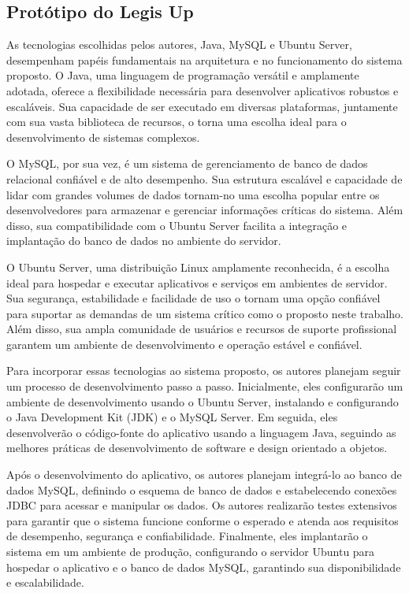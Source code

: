 \documentclass[12pt]{article}
\begin{document}
\subsection{Protótipo do Legis Up}

As tecnologias escolhidas pelos autores, Java, MySQL e Ubuntu Server, desempenham papéis fundamentais na arquitetura e no funcionamento do sistema proposto. O Java, uma linguagem de programação versátil e amplamente adotada, oferece a flexibilidade necessária para desenvolver aplicativos robustos e escaláveis. Sua capacidade de ser executado em diversas plataformas, juntamente com sua vasta biblioteca de recursos, o torna uma escolha ideal para o desenvolvimento de sistemas complexos.

O MySQL, por sua vez, é um sistema de gerenciamento de banco de dados relacional confiável e de alto desempenho. Sua estrutura escalável e capacidade de lidar com grandes volumes de dados tornam-no uma escolha popular entre os desenvolvedores para armazenar e gerenciar informações críticas do sistema. Além disso, sua compatibilidade com o Ubuntu Server facilita a integração e implantação do banco de dados no ambiente do servidor.

O Ubuntu Server, uma distribuição Linux amplamente reconhecida, é a escolha ideal para hospedar e executar aplicativos e serviços em ambientes de servidor. Sua segurança, estabilidade e facilidade de uso o tornam uma opção confiável para suportar as demandas de um sistema crítico como o proposto neste trabalho. Além disso, sua ampla comunidade de usuários e recursos de suporte profissional garantem um ambiente de desenvolvimento e operação estável e confiável.

Para incorporar essas tecnologias ao sistema proposto, os autores planejam seguir um processo de desenvolvimento passo a passo. Inicialmente, eles configurarão um ambiente de desenvolvimento usando o Ubuntu Server, instalando e configurando o Java Development Kit (JDK) e o MySQL Server. Em seguida, eles desenvolverão o código-fonte do aplicativo usando a linguagem Java, seguindo as melhores práticas de desenvolvimento de software e design orientado a objetos.

Após o desenvolvimento do aplicativo, os autores planejam integrá-lo ao banco de dados MySQL, definindo o esquema de banco de dados e estabelecendo conexões JDBC para acessar e manipular os dados. Os autores realizarão testes extensivos para garantir que o sistema funcione conforme o esperado e atenda aos requisitos de desempenho, segurança e confiabilidade. Finalmente, eles implantarão o sistema em um ambiente de produção, configurando o servidor Ubuntu para hospedar o aplicativo e o banco de dados MySQL, garantindo sua disponibilidade e escalabilidade.
\end{document}
